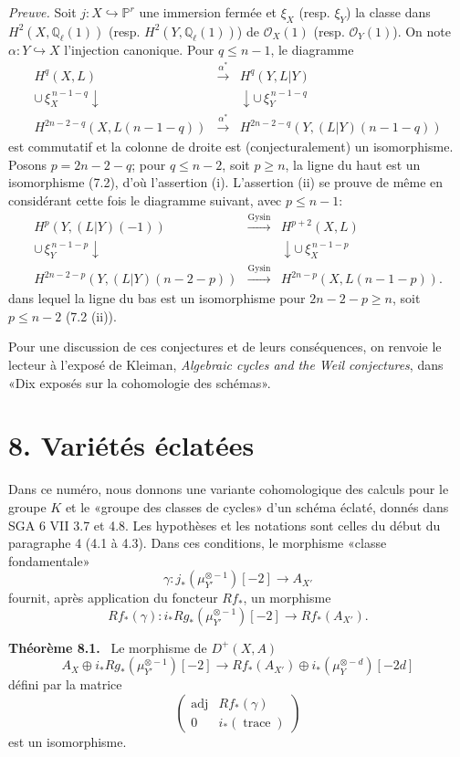 \documentclass[11pt]{article}
\newenvironment{statement}[1]{\par\medskip\noindent\textbf{#1.}\ }{\par\medskip}
\begin{document}
\emph{Preuve.} Soit $j:X\hookrightarrow\mathbb P^r$ une immersion fermée et $\xi_X$ (resp. $\xi_Y$) la classe dans $H^2(X,\mathbb Q_\ell(1))$ (resp. $H^2(Y,\mathbb Q_\ell(1))$) de $\mathcal O_X(1)$ (resp. $\mathcal O_Y(1)$). On note $\alpha:Y\hookrightarrow X$ l'injection canonique. Pour $q\le n-1$, le diagramme
\[
\begin{array}{ccc}
H^q(X,L)&\xrightarrow{\alpha^*}&H^q(Y,L|Y)\\
\cup\,\xi_X^{\,n-1-q}\downarrow&&\downarrow\cup\,\xi_Y^{\,n-1-q}\\
H^{2n-2-q}(X,L(n-1-q))&\xrightarrow{\alpha^*}&
H^{2n-2-q}(Y,(L|Y)(n-1-q))
\end{array}
\]
est commutatif et la colonne de droite est (conjecturalement) un isomorphisme. Posons $p=2n-2-q$; pour $q\le n-2$, soit $p\ge n$, la ligne du haut est un isomorphisme (7.2), d'où l'assertion (i). L'assertion (ii) se prouve de même en considérant cette fois le diagramme suivant, avec $p\le n-1$:
\[
\begin{array}{ccc}
H^p(Y,(L|Y)(-1))&\xrightarrow{\mathrm{Gysin}}&H^{p+2}(X,L)\\
\cup\,\xi_Y^{\,n-1-p}\downarrow&&\downarrow\cup\,\xi_X^{\,n-1-p}\\
H^{2n-2-p}(Y,(L|Y)(n-2-p))&\xrightarrow{\mathrm{Gysin}}&
H^{2n-p}(X,L(n-1-p)).
\end{array}
\]
dans lequel la ligne du bas est un isomorphisme pour $2n-2-p\ge n$, soit $p\le n-2$ (7.2 (ii)).

Pour une discussion de ces conjectures et de leurs conséquences, on renvoie le lecteur à l'exposé de Kleiman, \emph{Algebraic cycles and the Weil conjectures}, dans «Dix exposés sur la cohomologie des schémas».

\section*{8. Variétés éclatées}

Dans ce numéro, nous donnons une variante cohomologique des calculs pour le groupe $K$ et le «groupe des classes de cycles» d'un schéma éclaté, donnés dans SGA 6 VII 3.7 et 4.8. Les hypothèses et les notations sont celles du début du paragraphe 4 (4.1 à 4.3). Dans ces conditions, le morphisme «classe fondamentale»
\[
\gamma:j_*(\mu_{Y'}^{\otimes -1})[-2]\to A_{X'}
\]
fournit, après application du foncteur $Rf_*$, un morphisme
\[
Rf_*(\gamma):i_*Rg_*(\mu_{Y'}^{\otimes -1})[-2]\to Rf_*(A_{X'}).
\]

\begin{statement}{Théorème 8.1}
Le morphisme de $D^+(X,A)$
\[
A_X\oplus i_*Rg_*(\mu_{Y'}^{\otimes -1})[-2]\to
Rf_*(A_{X'})\oplus i_*(\mu_Y^{\otimes -d})[-2d]
\tag{8.1.1}
\]
défini par la matrice
\[
\begin{pmatrix}
\operatorname{adj}&Rf_*(\gamma)\\
0&i_*(\operatorname{trace})
\end{pmatrix}
\]
est un isomorphisme.
\end{statement}
\end{document}
